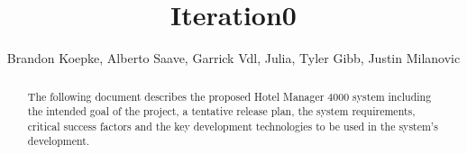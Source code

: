 \begin{frontmatter}
	\title{Iteration0}
	\author{Brandon Koepke, Alberto Saave, Garrick Vdl, Julia, Tyler Gibb, Justin Milanovic}
	\begin{abstract}
		The following document describes the proposed Hotel Manager 4000 system including the intended goal of the project, a tentative release plan, the system requirements, critical success factors and the key development technologies to be used in the system's development.
	\end{abstract}
\end{frontmatter}
\tableofcontents
\clearpage
